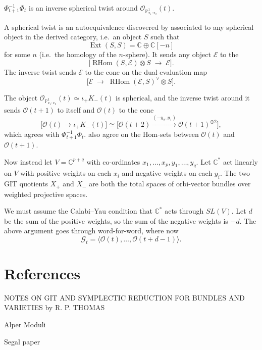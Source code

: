 \documentclass[12pt]{article}
\begin{document}
\begin{claim}
$\Phi_{t+1}^{-1}\Phi_t$ is an inverse spherical twist around 
$\mathcal{O}_{\mathbb{P}^1_{x_1:x_2}}(t)$.
\end{claim}

A spherical twist is an autoequivalence discovered by \cite{seidel-thomas} associated to any 
spherical object in the derived category, i.e.\ an object $S$ such that
\[
\operatorname{Ext}(S,S) = \mathbb{C} \oplus \mathbb{C}[-n]
\]
for some $n$ (i.e.\ the homology of the $n$-sphere). It sends any object $\mathcal{E}$ to the 
\[
\big[ \operatorname{RHom}(S,\mathcal{E}) \otimes S \;\longrightarrow\; \mathcal{E} \big].
\]
The inverse twist sends $\mathcal{E}$ to the cone on the dual evaluation map
\[
\big[ \mathcal{E} \;\longrightarrow\; \operatorname{RHom}(\mathcal{E},S)^\vee \otimes S \big].
\]

The object $\mathcal{O}_{\mathbb{P}^1_{x_1:x_2}}(t) \simeq \iota_+K_{-}(t)$ is spherical, and 
the inverse twist around it sends $\mathcal{O}(t+1)$ to itself and $\mathcal{O}(t)$ to the cone
\[
\big[\mathcal{O}(t) \longrightarrow \iota_+K_{-}(t)\big] 
\simeq \big[\mathcal{O}(t+2) \xrightarrow{(-y_2,y_1)} \mathcal{O}(t+1)^{\oplus 2}\big],
\]
which agrees with $\Phi_{t+1}^{-1}\Phi_t$. also agree on the Hom-sets between $\mathcal{O}(t)$ and 
$\mathcal{O}(t+1)$.

Now instead let $V = \mathbb{C}^{p+q}$ with co-ordinates $x_1,\ldots,x_p, y_1,\ldots,y_q$. 
Let $\mathbb{C}^*$ act linearly on $V$ with positive weights on each $x_i$ and negative weights 
on each $y_i$. The two GIT quotients $X_+$ and $X_-$ are both the total spaces of orbi-vector 
bundles over weighted projective spaces.

We must assume the Calabi–Yau condition that $\mathbb{C}^*$ acts through $SL(V)$. Let $d$ be the 
sum of the positive weights, so the sum of the negative weights is $-d$. The above argument goes 
through word-for-word, where now
\[
\mathcal{G}_t = \langle \mathcal{O}(t), \ldots, \mathcal{O}(t+d-1)\rangle.
\]

\section{References}
NOTES ON GIT AND SYMPLECTIC REDUCTION FOR
BUNDLES AND VARIETIES
by R. P. THOMAS

Alper Moduli 

Segal paper
\end{document}
